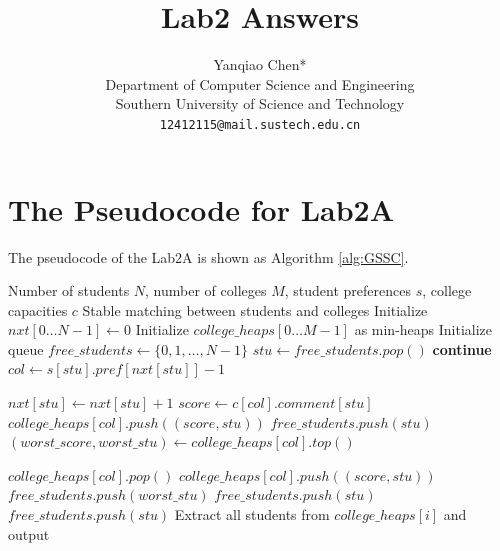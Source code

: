 \documentclass[a4paper, UTF-8]{article}
\theoremstyle{plain}
\begin{document}
\title{\bf{Lab2 Answers}}

\author{Yanqiao Chen*\\ 
  Department of Computer Science and Engineering\\
  Southern University of Science and Technology\\
  \texttt{12412115@mail.sustech.edu.cn}
  }

\maketitle

\section{The Pseudocode for Lab2A}

The pseudocode of the Lab2A is shown as Algorithm \ref{alg:GSSC}.
\begin{algorithm}
\caption{Gale-Shapley Algorithm for Student-College Matching}
\label{alg:GSSC}
\begin{algorithmic}[1]
\Require Number of students $N$, number of colleges $M$, student preferences $s$, college capacities $c$
\Ensure Stable matching between students and colleges
\State Initialize $nxt[0 \dots N-1] \gets 0$ 
\State Initialize $college\_heaps[0 \dots M-1]$ as min-heaps 
\State Initialize queue $free\_students \gets \{0, 1, \dots, N-1\}$
    \State $stu \gets free\_students.pop()$
        \State \textbf{continue} 
    \EndIf
    \State $col \gets s[stu].pref[nxt[stu]] - 1$
 
    \State $nxt[stu] \gets nxt[stu] + 1$
    \State $score \gets c[col].comment[stu]$
            \State $college\_heaps[col].push((score, stu))$
        \Else
            \State $free\_students.push(stu)$
        \EndIf
        \State $(worst\_score, worst\_stu) \gets college\_heaps[col].top()$
       
            \State $college\_heaps[col].pop()$
            \State $college\_heaps[col].push((score, stu))$
            \State $free\_students.push(worst\_stu)$
        \Else
            \State $free\_students.push(stu)$
        \EndIf
    \Else
        \State $free\_students.push(stu)$
    \EndIf
\EndWhile
{}
    \State Extract all students from $college\_heaps[i]$ and output
\EndFor
\end{algorithmic}
\end{algorithm}
\end{document}

